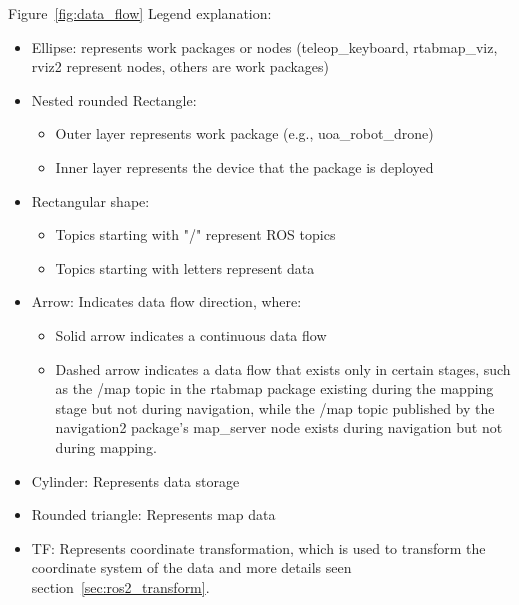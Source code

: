 
Figure~\ref{fig:data_flow} Legend explanation: 
\begin{itemize}
    \item Ellipse: represents work packages or nodes (teleop\_keyboard, rtabmap\_viz, rviz2 represent nodes, others are work packages)
    \item Nested rounded Rectangle: 
        \begin{itemize}
            \item Outer layer represents work package (e.g., uoa\_robot\_drone)
            \item Inner layer represents the device that the package is deployed
        \end{itemize}
    \item Rectangular shape:
        \begin{itemize}
            \item Topics starting with "/" represent ROS topics
            \item Topics starting with letters represent data
        \end{itemize}
    \item Arrow: Indicates data flow direction, where:
        \begin{itemize}
            \item Solid arrow indicates a continuous data flow
            \item Dashed arrow indicates a data flow that exists only in certain stages, such as the /map topic in the rtabmap package existing during the mapping stage but not during navigation, while the /map topic published by the navigation2 package's map\_server node exists during navigation but not during mapping.
        \end{itemize}
    \item Cylinder: Represents data storage
    \item Rounded triangle: Represents map data
    \item TF: Represents coordinate transformation, which is used to transform the coordinate system of the data and more details seen section~\ref{sec:ros2_transform}.
\end{itemize} 


